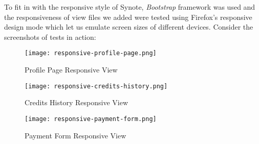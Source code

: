 To fit in with the responsive style of Synote, \textit{Bootstrap} framework was used and the responsiveness of view files we added were tested using Firefox’s responsive design mode \cite{firefoxresponsive} which let us emulate screen sizes of different devices. Consider the screenshots of tests in action:\\

\begin{figure}[!htb]
    \centering
    \begin{minipage}{.45\textwidth}
        \centering
        \texttt{[image: responsive-profile-page.png]}
        \caption{Profile Page Responsive View}
        \label{fig:responsive-profile}
        \texttt{[image: responsive-credits-history.png]}
        \caption{Credits History Responsive View}
        \label{fig:responsive-credits-history}
    \end{minipage}%
    \hspace{0.1cm}
    \begin{minipage}{0.5\textwidth}
      \centering
      \centering
      \texttt{[image: responsive-payment-form.png]}
      \caption{Payment Form Responsive View}
      \label{fig:responsive-payment-form}
    \end{minipage}
\end{figure}
